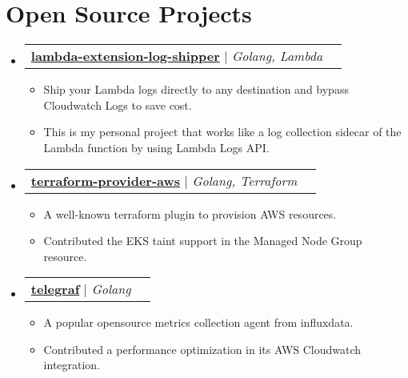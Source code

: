 \documentclass[letterpaper,11pt]{article}
\makeatletter
\newcommand{\resumeItem}[1]{
  \item\small{
    {#1 \vspace{-2pt}}
  }
}
\newcommand{\resumeProjectHeading}[1]{
    \item
    \begin{tabular*}{1.001\textwidth}{l@{\extracolsep{\fill}}r}
      \small#1 \\
    \end{tabular*}\vspace{-7pt}
}
\newcommand{\resumeSubHeadingListStart}{\begin{itemize}[leftmargin=0.0in, label={}]}
\newcommand{\resumeSubHeadingListEnd}{\end{itemize}}
\newcommand{\resumeItemListStart}{\begin{itemize}}
\newcommand{\resumeItemListEnd}{\end{itemize}}
\makeatother
\begin{document}
\section{Open Source Projects}
    \vspace{-5pt}
    \resumeSubHeadingListStart
        \resumeProjectHeading
          {\textbf{\href{https://github.com/david7482/lambda-extension-log-shipper}{lambda-extension-log-shipper}} $|$ \emph{Golang, Lambda}}
          \resumeItemListStart
            \resumeItem{Ship your Lambda logs directly to any destination and bypass Cloudwatch Logs to save cost.}
            \resumeItem{This is my personal project that works like a log collection sidecar of the Lambda function by using Lambda Logs API.}
          \resumeItemListEnd
          \vspace{-22pt}
        \resumeProjectHeading
          {\textbf{\href{https://github.com/hashicorp/terraform-provider-aws}{terraform-provider-aws}} $|$ \emph{Golang, Terraform}}
          \resumeItemListStart
            \resumeItem{A well-known terraform plugin to provision AWS resources.}
            \resumeItem{Contributed the EKS taint support in the Managed Node Group resource.}
          \resumeItemListEnd
          \vspace{-22pt}
        \resumeProjectHeading
          {\textbf{\href{https://github.com/influxdata/telegraf}{telegraf}} $|$ \emph{Golang}}
          \resumeItemListStart
            \resumeItem{A popular opensource metrics collection agent from influxdata.}
            \resumeItem{Contributed a performance optimization in its AWS Cloudwatch integration.}
          \resumeItemListEnd
    \resumeSubHeadingListEnd

%
\end{document}
